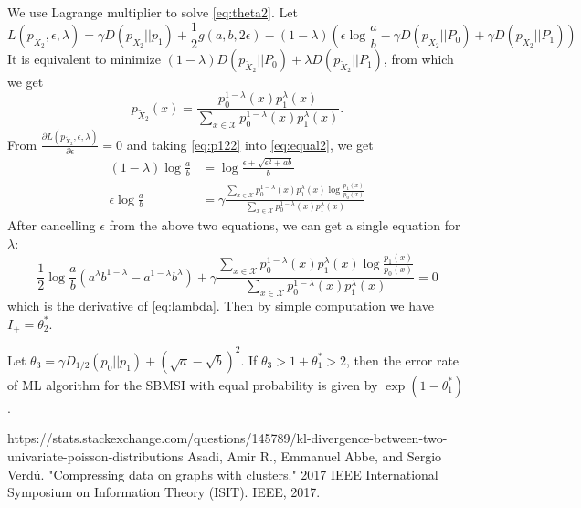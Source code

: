 \documentclass{article}
\begin{document}
We use Lagrange multiplier to solve \eqref{eq:theta2}.
Let
$$
L(p_{\widetilde{X}_2},\epsilon, \lambda)
=\gamma D(p_{\widetilde{X}_2}|| p_1)+ \frac{1}{2} g(a,b, 2\epsilon) - (1-\lambda)(\epsilon \log\frac{a}{b}-\gamma
D(p_{\widetilde{X}_2} || P_0) + \gamma D(p_{\widetilde{X}_2} || P_1))
$$
It is equivalent to minimize
$(1-\lambda)D(p_{\widetilde{X}_2} || P_0) +
\lambda D(p_{\widetilde{X}_2} || P_1) $, from
which we get
\begin{equation}\label{eq:p122}
p_{\widetilde{X}_2}(x) = \frac{p_0^{1-\lambda}(x)p_1^{\lambda}(x)}{\sum_{x \in \mathcal{X}}p_0^{1-\lambda}(x) p_1^{\lambda} (x)}.
\end{equation}
From $\frac{\partial L(p_{\widetilde{X}_2},\epsilon, \lambda)}{\partial \epsilon}=0$ and taking \eqref{eq:p122}
into \eqref{eq:equal2}, we get
\begin{align*}
    (1-\lambda) \log \frac{a}{b}
    & = \log \frac{\epsilon + \sqrt{\epsilon^2+ab}}{b} \\
    \epsilon \log \frac{a}{b}
    & = \gamma\frac{\sum_{x \in \mathcal{X}}p_0^{1-\lambda}(x) p_1^{\lambda} (x)\log \frac{p_1(x)}{p_0(x)}}{\sum_{x \in \mathcal{X}}p_0^{1-\lambda}(x) p_1^{\lambda} (x)}
\end{align*}
After cancelling $\epsilon$
from the above two equations, we can get a single equation
for $\lambda$:
\begin{equation}
    \frac{1}{2}\log\frac{a}{b}
    (a^{\lambda} b^{1-\lambda}
    -a^{1-\lambda} b^{\lambda})
    + \gamma \frac{\sum_{x \in \mathcal{X}}p_0^{1-\lambda}(x) p_1^{\lambda} (x)\log \frac{p_1(x)}{p_0(x)}}{\sum_{x \in \mathcal{X}}p_0^{1-\lambda}(x) p_1^{\lambda} (x)}=0
\end{equation}
which is the derivative of \eqref{eq:lambda}.
Then by simple computation we have
$I_+ = \theta_2^*$.

Let $\theta_3 = \gamma D_{1/2}(p_0||p_1) + (\sqrt{a} - \sqrt{b})^2$.
If $\theta_3 > 1 + \theta_1^* > 2$, then the error rate of ML
algorithm for the SBMSI with equal probability is given by
$\exp(1-\theta_1^*)$.
\begin{thebibliography}{9}
 https://stats.stackexchange.com/questions/145789/kl-divergence-between-two-univariate-poisson-distributions
 Asadi, Amir R., Emmanuel Abbe, and Sergio Verdú. "Compressing data on graphs with clusters." 2017 IEEE International Symposium on Information Theory (ISIT). IEEE, 2017.
\end{thebibliography}
\end{document}
